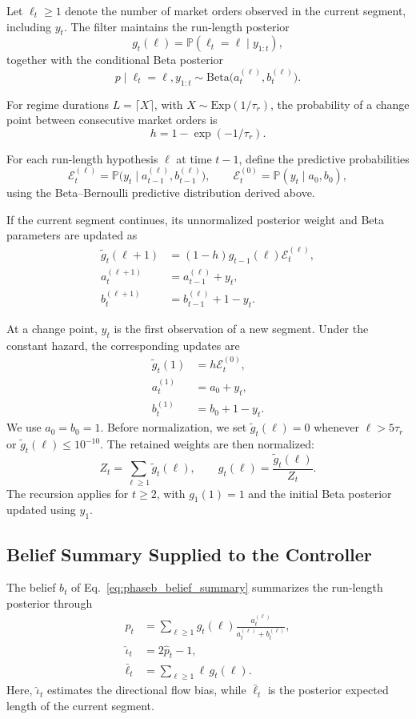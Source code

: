 \documentclass[11pt,a4paper]{article}
\newcommand{\Prob}{\mathbb{P}}
\begin{document}
Let $\ell_t\geq 1$ denote the number of market orders
observed in the current segment, including $y_t$.
The filter maintains the run-length posterior
\[
  g_t(\ell)=\Prob(\ell_t=\ell\mid y_{1:t}),
\]
together with the conditional Beta posterior
\[
  p\mid \ell_t=\ell,y_{1:t}
  \sim
  \mathrm{Beta}\bigl(a_t^{(\ell)},b_t^{(\ell)}\bigr).
\]

For regime durations $L=\lceil X\rceil$, with
$X\sim\mathrm{Exp}(1/\tau_r)$, the probability
of a change point between consecutive market orders is
\[
  h=1-\exp(-1/\tau_r).
\]

For each run-length hypothesis $\ell$ at time $t-1$,
define the predictive probabilities
\[
  \mathcal E_t^{(\ell)}
  =
  \Prob\bigl(y_t\mid
  a_{t-1}^{(\ell)},b_{t-1}^{(\ell)}\bigr),
  \qquad
  \mathcal E_t^{(0)}
  =
  \Prob(y_t\mid a_0,b_0),
\]
using the Beta--Bernoulli predictive distribution
derived above.

If the current segment continues, its unnormalized
posterior weight and Beta parameters are updated as
\[
  \begin{aligned}
  \widetilde g_t(\ell+1)
  &=
  (1-h)g_{t-1}(\ell)\mathcal E_t^{(\ell)},\\
  a_t^{(\ell+1)}
  &=
  a_{t-1}^{(\ell)}+y_t,\\
  b_t^{(\ell+1)}
  &=
  b_{t-1}^{(\ell)}+1-y_t.
  \end{aligned}
\]

At a change point, $y_t$ is the first observation
of a new segment. Under the constant hazard,
the corresponding updates are
\[
  \begin{aligned}
  \widetilde g_t(1)
  &=
  h\mathcal E_t^{(0)},\\
  a_t^{(1)}
  &=
  a_0+y_t,\\
  b_t^{(1)}
  &=
  b_0+1-y_t.
  \end{aligned}
\]
We use $a_0=b_0=1$. Before normalization, we set
$\widetilde g_t(\ell)=0$ whenever $\ell>5\tau_r$ or
$\widetilde g_t(\ell)\leq10^{-10}$.
The retained weights are then normalized:
\[
  Z_t=\sum_{\ell\geq1}\widetilde g_t(\ell),
  \qquad
  g_t(\ell)=\frac{\widetilde g_t(\ell)}{Z_t}.
\]
The recursion applies for $t\geq2$, with
$g_1(1)=1$ and the initial Beta posterior
updated using $y_1$.

\subsection{Belief Summary Supplied to the Controller}

The belief $b_t$ of Eq.~\eqref{eq:phaseb_belief_summary}
summarizes the run-length posterior through
\[
  \begin{aligned}
  \widehat p_t
  &=
  \sum_{\ell\geq1}g_t(\ell)
  \frac{a_t^{(\ell)}}{a_t^{(\ell)}+b_t^{(\ell)}},\\
  \widehat{\iota}_t
  &=
  2\widehat p_t-1,\\
  \bar{\ell}_t
  &=
  \sum_{\ell\geq1}\ell\,g_t(\ell).
  \end{aligned}
\]
Here, $\widehat{\iota}_t$ estimates the directional
flow bias, while $\bar{\ell}_t$ is the posterior
expected length of the current segment.
\end{document}
